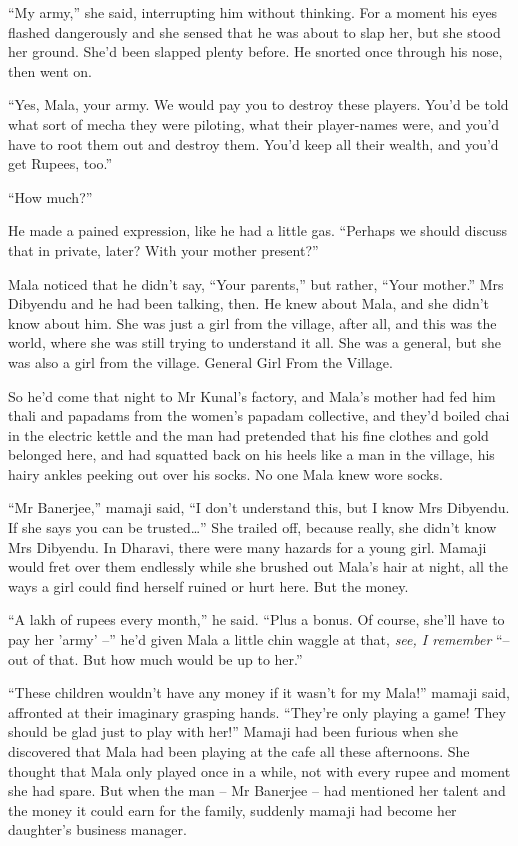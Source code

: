 ``My army,'' she said, interrupting him without thinking. For a
moment his eyes flashed dangerously and she sensed that he was
about to slap her, but she stood her ground. She'd been slapped
plenty before. He snorted once through his nose, then went on.

``Yes, Mala, your army. We would pay you to destroy these players.
You'd be told what sort of mecha they were piloting, what their
player-names were, and you'd have to root them out and destroy
them. You'd keep all their wealth, and you'd get Rupees, too.''

``How much?''

He made a pained expression, like he had a little gas. ``Perhaps we
should discuss that in private, later? With your mother present?''

Mala noticed that he didn't say, ``Your parents,'' but rather, ``Your
mother.'' Mrs Dibyendu and he had been talking, then. He knew about
Mala, and she didn't know about him. She was just a girl from the
village, after all, and this was the world, where she was still
trying to understand it all. She was a general, but she was also a
girl from the village. General Girl From the Village.

So he'd come that night to Mr Kunal's factory, and Mala's mother
had fed him thali and papadams from the women's papadam collective,
and they'd boiled chai in the electric kettle and the man had
pretended that his fine clothes and gold belonged here, and had
squatted back on his heels like a man in the village, his hairy
ankles peeking out over his socks. No one Mala knew wore socks.

``Mr Banerjee,'' mamaji said, ``I don't understand this, but I know
Mrs Dibyendu. If she says you can be trusted\ldots{}'' She trailed off,
because really, she didn't know Mrs Dibyendu. In Dharavi, there
were many hazards for a young girl. Mamaji would fret over them
endlessly while she brushed out Mala's hair at night, all the ways
a girl could find herself ruined or hurt here. But the money.

``A lakh of rupees every month,'' he said. ``Plus a bonus. Of course,
she'll have to pay her 'army' --'' he'd given Mala a little chin
waggle at that, \emph{see, I remember} ``-- out of that. But how
much would be up to her.''

``These children wouldn't have any money if it wasn't for my Mala!''
mamaji said, affronted at their imaginary grasping hands. ``They're
only playing a game! They should be glad just to play with her!''
Mamaji had been furious when she discovered that Mala had been
playing at the cafe all these afternoons. She thought that Mala
only played once in a while, not with every rupee and moment she
had spare. But when the man -- Mr Banerjee -- had mentioned her
talent and the money it could earn for the family, suddenly mamaji
had become her daughter's business manager.

